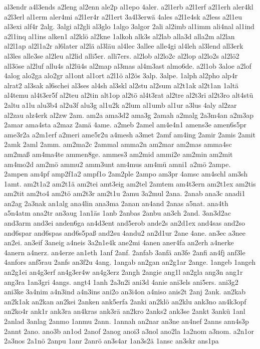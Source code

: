 {al3endr
a4l3ends
a2leng
al2enn
ale2p
al1epo
4aler.
a2l1erb
a2l1erf
a2l1erh
aler4kl
a2l3erl
al1erm
aler4mi
a2l1er4r
a2l1ert
3a4l3erwä
4ales
a2l1e4sk
a2less
a2l1eu
al3exi
alf4r
2alg.
3algi
al2gli
al3glo
1algo
3algor
2ali
al2imb
al1imm
ali4nal
al1ind
a2l1inq
al1ins
alken1
al2klö
al2kne
1alkoh
alk3s
al2lab
alla3d
alla2m
al2lan
al2l1ap
al2l1a2r
al6later
al2lä
al3läu
al4lec
3allee
alle4gi
al4leh
al3lend
all3erk
al3les
alle3se
al2leu
al2lid
alli5er.
alli7ers.
al2lob
al2lo2c
al2lop
al2lo2s
al2lö2
all3öse
al2luf
allu4s
al2lü4s
al2map
al3mas
al4m3ast
almo6de.
a2l1ob
3aloe
a2lof
4alog
alo2ga
alo2gr
al1ont
al1ort
a2l1ö
al2ös
3alp.
3alpe.
1alph
al2pho
alp4r
alrat2
al3sak
al6schei
al3ses
al4sh
al3skl
al2stu
al2sum
al2t1ak
al2t1an
1altä
al4temu
al4t3er5f
al2teu
al2tin
alt1op
al2tö
al4t3rat
al2tre
al2t3ri
al2t3ro
alt4stü
2altu
a1lu
alu3b4
al2u3f
alu3g
al1u2k
a2lum
al1umb
al1ur
a3lus
4aly
al2zar
al2zau
alz4erk
al2zw
2am.
am2a
ama3d2
ama3g
2amah
a2malg
2a3m4an
a2m3ap
2amar
ama4sta
a2maz
2amä
4ame.
a2meb
2amel
am4e4n1
amens3e
amen6s5pr
ame3r2a
a2m1erf
a2meri
ame5r2u
a4mesh
a3met
2amf
am4ing
2amir
2amis
2amit
2amk
2aml
2amm.
am2ma2c
2ammal
amma2n
am2mar
am2mas
amma4sc
am2maß
am4ma4te
ammen8ge.
ammes3
am2mid
ammi2e
am2min
am2mit
am4mo2d
am2mö
ammu2
amm3unt
am4mus
am4mü
amni1
a2mö
2ampe.
2ampen
am4pf
amp2f1a2
ampf1o
2am2ple
2ampo
am3pr
4amsc
am4schl
am3sh
1amt.
am2t1a2
am2t1ä
am2tei
amt3eig
am2tel
2amtem
am4t3ern
am2t1ex
am2tis
am2tit
am2to4
am2tö
am2t3r
am2t1u
2amu
3a2mul
2ana.
2anab
ana3c
anadi1
an2ag
2a3nak
an1alg
ana4lin
ana3ma
2anan
an4and
2anas
a5nat.
ana4th
a5n4atm
ana2tr
an3aug
1an1äs
1anb
2anbas
2anbu
an3ch
2and.
3an3d2ac
and3arm
and3ei
anden6ga
an4d3ent
and5erob
ande2s
an2d1ex
and4sas
and2so
and6spar
and6spas
and6s5paß
and2su
4andu2
an2d1ur
2ane
4ane.
an3ec
a3nee
an2ei.
an3eif
3aneig
a4neis
3a2n1e4k
ane2mi
4anen
aner4fa
an2erh
a4nerke
4anern
a4nerz.
an4erze
an1eth
1anf
2anf.
2anfab
3anfä
an3fe
2anfi
an4fj
anf3le
4anfors
anf5rau
2anfs
an3f2u
4ang.
1angab
an2gan
an2g1ar
2ange.
1angeb
1angeh
an2g1ei
an4g3erf
an4g3er4w
an4g3erz
2angh
2angie
ang1l
an2gla
ang3n
ang1r
ang3ra
1an3gri
4angs.
angt4
1anh
2a3n2i
ani3d
4anie
ani3els
ani5ers.
ani3g2
ani3ke
3a4nim
a4n3ind
a4n3ins
ani2o
an3i4on
a4niso
anis2t
2anj
2ank.
an2kab
an2k1ak
an2kan
an2kei
2anken
ank5erfa
2anki
an2klö
an2klu
ank3no
an4k3opf
an2ko4r
ank1r
ank3ra
an4kras
ank3rä
an2kro
2anks2
ank3se
2ankt
3ankü
1anl
2anlad
3anlag
2anmo
1anmu
2ann.
1annah
an2nar
an3ne
an4nef
2anns
ann4s3p
2annt
2ano.
ano3b
an1od
2anof
2anog
anoi3
a3nol
ano2la
1a2nom
a3nom.
a2n1or
2a3nos
2a1nö
2anpu
1anr
2anrö
an3s4ar
1an3s2ä
1ansc
an3skr
ans1pa
}
